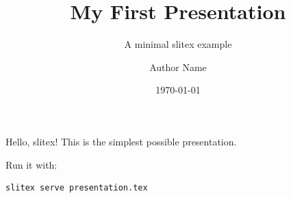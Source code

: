 \documentclass[aspectratio=169]{beamer}
\title{My First Presentation}
\subtitle{A minimal slitex example}
\author{Author Name}
\institute{My University}
\date{\today}
\begin{document}
\begin{frame}
  \titlepage
\end{frame}

\begin{frame}{Hello, slitex!}
  This is the simplest possible presentation.

  Run it with:

  \begin{verbatim}
slitex serve presentation.tex
  \end{verbatim}
\end{frame}
\end{document}
